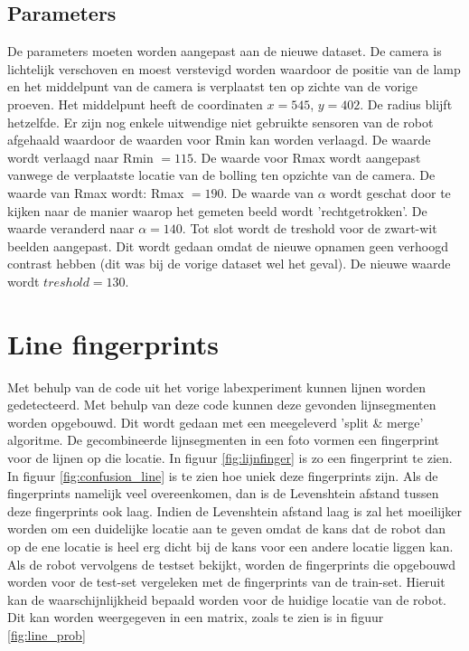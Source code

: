 \documentclass[a4paper]{article}
\begin{document}
\subsection{Parameters}
De parameters moeten worden aangepast aan de nieuwe dataset. De camera is lichtelijk verschoven en moest verstevigd worden waardoor de positie van de lamp en het middelpunt van de camera is verplaatst ten op zichte van de vorige proeven. Het middelpunt heeft de coordinaten $x = 545$, $y = 402$. De radius blijft hetzelfde. Er zijn nog enkele uitwendige niet gebruikte sensoren van de robot afgehaald waardoor de waarden voor Rmin kan worden verlaagd. De waarde wordt verlaagd naar Rmin $= 115$. De waarde voor Rmax wordt aangepast vanwege de verplaatste locatie van de bolling ten opzichte van de camera. De waarde van Rmax wordt: Rmax $= 190$. De waarde van $\alpha$ wordt geschat door te kijken naar de manier waarop het gemeten beeld wordt 'rechtgetrokken'. De waarde veranderd naar $\alpha = 140$. Tot slot wordt de treshold voor de zwart-wit beelden aangepast. Dit wordt gedaan omdat de nieuwe opnamen geen verhoogd contrast hebben (dit was bij de vorige dataset wel het geval). De nieuwe waarde wordt  $treshold = 130$.


\section{Line fingerprints}
Met behulp van de code uit het vorige labexperiment kunnen lijnen worden gedetecteerd. Met behulp van deze code kunnen deze gevonden lijnsegmenten worden opgebouwd. Dit wordt gedaan met een meegeleverd 'split \& merge' algoritme. De gecombineerde lijnsegmenten in een foto vormen een fingerprint voor de lijnen op die locatie. In figuur \ref{fig:lijnfinger} is zo een fingerprint te zien. 
In figuur \ref{fig:confusion_line} is te zien hoe uniek deze fingerprints zijn. Als de fingerprints namelijk veel overeenkomen, dan is de Levenshtein afstand tussen deze fingerprints ook laag. Indien de Levenshtein afstand laag is zal het moeilijker worden om een duidelijke locatie aan te geven omdat de kans dat de robot dan op de ene locatie is heel erg dicht bij de kans voor een andere locatie liggen kan. 
Als de robot vervolgens de testset bekijkt, worden de fingerprints die opgebouwd worden voor de test-set vergeleken met de fingerprints van de train-set. Hieruit kan de waarschijnlijkheid bepaald worden voor de huidige locatie van de robot. Dit kan worden weergegeven in een matrix, zoals te zien is in figuur \ref{fig:line_prob}
\end{document}

